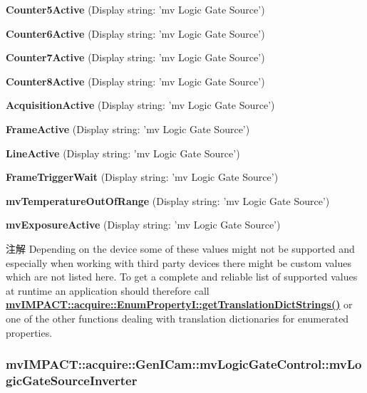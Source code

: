 \begin{DoxyItemize}
\item {\bfseries Counter5\+Active} (Display string\+: 'mv Logic Gate Source')
\item {\bfseries Counter6\+Active} (Display string\+: 'mv Logic Gate Source')
\item {\bfseries Counter7\+Active} (Display string\+: 'mv Logic Gate Source')
\item {\bfseries Counter8\+Active} (Display string\+: 'mv Logic Gate Source')
\item {\bfseries Acquisition\+Active} (Display string\+: 'mv Logic Gate Source')
\item {\bfseries Frame\+Active} (Display string\+: 'mv Logic Gate Source')
\item {\bfseries Line\+Active} (Display string\+: 'mv Logic Gate Source')
\item {\bfseries Frame\+Trigger\+Wait} (Display string\+: 'mv Logic Gate Source')
\item {\bfseries mv\+Temperature\+Out\+Of\+Range} (Display string\+: 'mv Logic Gate Source')
\item {\bfseries mv\+Exposure\+Active} (Display string\+: 'mv Logic Gate Source')
\end{DoxyItemize}

\begin{DoxyNote}{注解}
Depending on the device some of these values might not be supported and especially when working with third party devices there might be custom values which are not listed here. To get a complete and reliable list of supported values at runtime an application should therefore call {\bfseries \hyperlink{classmv_i_m_p_a_c_t_1_1acquire_1_1_enum_property_i_a0ba6ccbf5ee69784d5d0b537924d26b6}{mv\+I\+M\+P\+A\+C\+T\+::acquire\+::\+Enum\+Property\+I\+::get\+Translation\+Dict\+Strings()}} or one of the other functions dealing with translation dictionaries for enumerated properties. 
\end{DoxyNote}
\hypertarget{classmv_i_m_p_a_c_t_1_1acquire_1_1_gen_i_cam_1_1mv_logic_gate_control_ad028a53703d0d80731468d75a55a6071}{
\subsubsection[{mv\+Logic\+Gate\+Source\+Inverter}]{ mv\+I\+M\+P\+A\+C\+T\+::acquire\+::\+Gen\+I\+Cam\+::mv\+Logic\+Gate\+Control\+::mv\+Logic\+Gate\+Source\+Inverter}}\label{classmv_i_m_p_a_c_t_1_1acquire_1_1_gen_i_cam_1_1mv_logic_gate_control_ad028a53703d0d80731468d75a55a6071}


